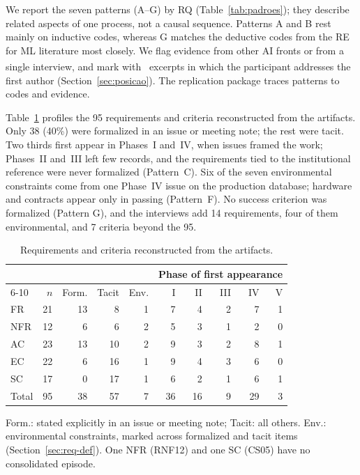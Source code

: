 \documentclass[sigconf,nonacm]{acmart}
\begin{document}
We report the seven patterns (A--G) by RQ (Table~\ref{tab:padroes}); they describe related aspects of one process, not a causal sequence. Patterns A and B rest mainly on inductive codes, whereas G matches the deductive codes from the RE for ML literature most closely. We flag evidence from other AI fronts or from a single interview, and mark with~\textsuperscript{\dag} excerpts in which the participant addresses the first author (Section~\ref{sec:posicao}). The replication package traces patterns to codes and evidence.

Table~\ref{tab:profile} profiles the 95 requirements and criteria reconstructed from the artifacts. Only 38 (40\%) were formalized in an issue or meeting note; the rest were tacit. Two thirds first appear in Phases~I and~IV, when issues framed the work; Phases~II and~III left few records, and the requirements tied to the institutional reference were never formalized (Pattern~C). Six of the seven environmental constraints come from one Phase~IV issue on the production database; hardware and contracts appear only in passing (Pattern~F). No success criterion was formalized (Pattern G), and the interviews add 14 requirements, four of them environmental, and 7 criteria beyond the 95.

\begin{table}
\centering
\caption{Requirements and criteria reconstructed from the artifacts.}
\label{tab:profile}
\begin{tabular*}{\columnwidth}{@{\extracolsep{\fill}}lrrrrrrrrr}
\hline
 & & & & & \multicolumn{5}{c}{Phase of first appearance} \\
\cline{6-10}
 & $n$ & Form. & Tacit & Env. & I & II & III & IV & V \\
\hline
FR    & 21 & 13 &  8 & 1 &  7 &  4 & 2 &  7 & 1 \\
NFR   & 12 &  6 &  6 & 2 &  5 &  3 & 1 &  2 & 0 \\
AC    & 23 & 13 & 10 & 2 &  9 &  3 & 2 &  8 & 1 \\
EC    & 22 &  6 & 16 & 1 &  9 &  4 & 3 &  6 & 0 \\
SC    & 17 &  0 & 17 & 1 &  6 &  2 & 1 &  6 & 1 \\
\hline
Total & 95 & 38 & 57 & 7 & 36 & 16 & 9 & 29 & 3 \\
\hline
\end{tabular*}
\par\smallskip
\parbox{\columnwidth}{\footnotesize Form.: stated explicitly in an issue or meeting note; Tacit: all others. Env.: environmental constraints, marked across formalized and tacit items (Section~\ref{sec:req-def}). One NFR (RNF12) and one SC (CS05) have no consolidated episode.}
\end{table}
\end{document}
